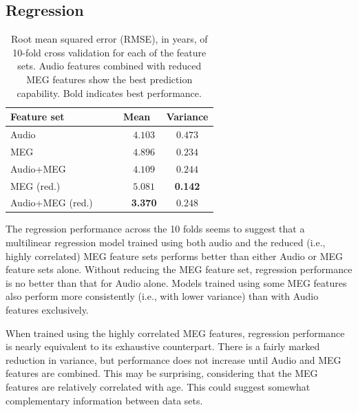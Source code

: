 \documentclass[utf8]{frontiersSCNS} %
\begin{document}
\subsection{Regression}

\begin{table}[t]
  \centering
  \label{tab:reg_results}
  \begin{tabular}{| l | c | c |}
    \toprule
    \multicolumn{1}{l}{\textbf{Feature set}} & \multicolumn{1}{c}{\textbf{Mean}} & \multicolumn{1}{c}{\textbf{Variance}} \\
    \toprule
        Audio~~~                             & ~~~$4.103$         &     $0.473$       \\
        MEG~~~                               & ~~~$4.896$         &     $0.234$       \\
        Audio+MEG~~~                         & ~~~$4.109$         &     $0.244$       \\

        \midrule
       
        MEG (red.)~~~                        & ~~~$5.081$         &     \textbf{0.142}       \\
        Audio+MEG (red.)~~~                  & ~~~\textbf{3.370}         &     $0.248$       \\

        \bottomrule
  \end{tabular}
  \caption{Root mean squared error (RMSE), in years, of 10-fold cross validation for each of the feature sets. Audio features combined with reduced MEG features show the best prediction capability. Bold indicates best performance.}
\end{table}

The regression performance across the 10 folds seems to suggest that a multilinear regression model trained using both audio and the reduced (i.e., highly correlated) MEG feature sets performs better than either Audio or MEG feature sets alone. Without  reducing the MEG feature set, regression performance is no better than that for Audio alone. Models trained using some MEG features also  perform more consistently (i.e., with lower variance) than with Audio features exclusively.

When trained using the highly correlated MEG features, regression performance is nearly equivalent to its exhaustive counterpart. There is a fairly marked reduction in variance, but performance does not increase until Audio and MEG features are combined. This may be surprising, considering that the MEG features are relatively correlated with age. This could suggest somewhat complementary information between data sets. %
\end{document}
